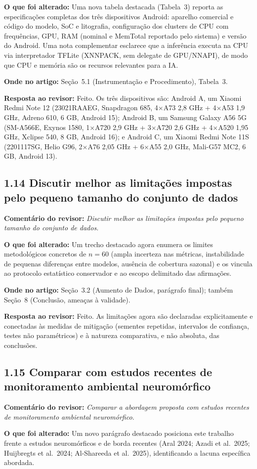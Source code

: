\documentclass[11pt,a4paper]{article}
\newcommand{\comment}[1]{\textbf{Comentário do revisor:} \textit{#1}}
\newcommand{\change}[1]{\textbf{O que foi alterado:} #1}
\newcommand{\where}[1]{\textbf{Onde no artigo:} #1}
\newcommand{\resp}[1]{\textbf{Resposta ao revisor:} \textcolor{revblue}{#1}}
\newcommand{\pt}[1]{\subsection*{#1}}
\begin{document}
\change{Uma nova tabela destacada (Tabela~3) reporta as especificações completas dos três dispositivos Android: aparelho comercial e código do modelo, SoC e litografia, configuração dos clusters de CPU com frequências, GPU, RAM (nominal e MemTotal reportado pelo sistema) e versão do Android. Uma nota complementar esclarece que a inferência executa na CPU via interpretador TFLite (XNNPACK, sem delegate de GPU/NNAPI), de modo que CPU e memória são os recursos relevantes para a IA.}

\where{Seção~5.1 (Instrumentação e Procedimento), Tabela~3.}

\resp{Feito. Os três dispositivos são: Android A, um Xiaomi Redmi Note 12 (23021RAAEG, Snapdragon 685, 4$\times$A73 2,8 GHz + 4$\times$A53 1,9 GHz, Adreno 610, 6 GB, Android 15); Android B, um Samsung Galaxy A56 5G (SM-A566E, Exynos 1580, 1$\times$A720 2,9 GHz + 3$\times$A720 2,6 GHz + 4$\times$A520 1,95 GHz, Xclipse 540, 8 GB, Android 16); e Android C, um Xiaomi Redmi Note 11S (2201117SG, Helio G96, 2$\times$A76 2,05 GHz + 6$\times$A55 2,0 GHz, Mali-G57 MC2, 6 GB, Android 13).}

\pt{1.14 Discutir melhor as limitações impostas pelo pequeno tamanho do conjunto de dados}
\comment{Discutir melhor as limitações impostas pelo pequeno tamanho do conjunto de dados.}

\change{Um trecho destacado agora enumera os limites metodológicos concretos de $n=60$ (ampla incerteza nas métricas, instabilidade de pequenas diferenças entre modelos, ausência de cobertura sazonal) e os vincula ao protocolo estatístico conservador e ao escopo delimitado das afirmações.}

\where{Seção~3.2 (Aumento de Dados, parágrafo final); também Seção~8 (Conclusão, ameaças à validade).}

\resp{Feito. As limitações agora são declaradas explicitamente e conectadas às medidas de mitigação (sementes repetidas, intervalos de confiança, testes não paramétricos) e à natureza comparativa, e não absoluta, das conclusões.}

\pt{1.15 Comparar com estudos recentes de monitoramento ambiental neuromórfico}
\comment{Comparar a abordagem proposta com estudos recentes de monitoramento ambiental neuromórfico.}

\change{Um novo parágrafo destacado posiciona este trabalho frente a estudos neuromórficos e de borda recentes (Aral 2024; Azadi et al.\ 2025; Huijbregts et al.\ 2024; Al-Shareeda et al.\ 2025), identificando a lacuna específica abordada.}
\end{document}
